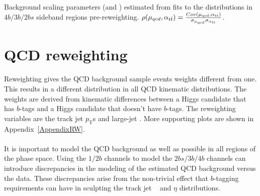 \begin{table}[htb!]
\begin{center}
\caption{Background scaling parameters (\muqcd and \alphatt) estimated from fits to the \mleadJ distributions in $4b/3b/2bs$ sideband regions pre-reweighting. $\rho(\mu_{qcd},\alpha_{t\bar{t}}) = \frac{Cov(\rm \mu_{qcd},\rm \alpha_{\rm tt})}{\rm \sigma_{\mu_{qcd}} \rm \sigma_{\rm \alpha_{ tt}} }$.}

\label{tab:bkgfit_prereweight}
\end{center}
\end{table}



\section{QCD reweighting}
\label{sec:boosted-reweight}

\paragraph{}
Reweighting gives the QCD background sample events weights different from one.
This results in a different distribution in all QCD kinematic distributions.
The weights are derived from kinematic differences between a Higgs candidate that has $b$-tags and a Higgs candidate that doesn't have $b$-tags.
The reweighting variables are the track jet $p_\text{T}$s and large-\R jet \pt.
More supporting plots are shown in Appendix~\ref{AppendixRW}.

\paragraph{}
It is important to model the QCD background as well as possible in all regions of the phase space.
Using the $1/2b$ channels to model the $2bs/3b/4b$ channels can introduce discrepancies in the modeling of the estimated QCD background versus the data. 
These discrepancies arise from the non-trivial effect that $b$-tagging requirements can have in sculpting the track jet \pt~ and $\eta$ distributions.

